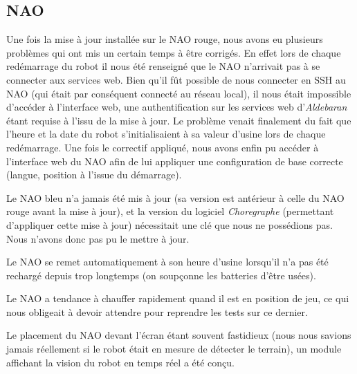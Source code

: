 \subsection{NAO}
  \par Une fois la mise à jour installée sur le NAO rouge, nous avons eu plusieurs problèmes qui ont mis un certain temps à être corrigés.
  En effet lors de chaque redémarrage du robot il nous été renseigné que le NAO n’arrivait pas à se connecter aux services web.
  Bien qu’il fût possible de nous connecter en SSH au NAO (qui était par conséquent connecté au réseau local), il nous était impossible d’accéder à l’interface web, une authentification sur les services web d’\textit{Aldebaran} étant requise à l'issu de la mise à jour.
  Le problème venait finalement du fait que l’heure et la date du robot s’initialisaient à sa valeur d’usine lors de chaque redémarrage.
  Une fois le correctif appliqué, nous avons enfin pu accéder à l'interface web du NAO afin de lui appliquer une configuration de base correcte (langue, position à l'issue du démarrage).
  \par Le NAO bleu n’a jamais été mis à jour (sa version est antérieur à celle du NAO rouge avant la mise à jour), et la version du logiciel \textit{Choregraphe} (permettant d’appliquer cette mise à jour) nécessitait une clé que nous ne possédions pas.
  Nous n'avons donc pas pu le mettre à jour.
  \par Le NAO se remet automatiquement à son heure d’usine lorsqu’il n’a pas été rechargé depuis trop longtemps (on soupçonne les batteries d’être usées).
  \par Le NAO a tendance à chauffer rapidement quand il est en position de jeu, ce qui nous obligeait à devoir attendre pour reprendre les tests sur ce dernier.
  \par Le placement du NAO devant l’écran étant souvent fastidieux (nous nous savions jamais réellement si le robot était en mesure de détecter le terrain), un module affichant la vision du robot en temps réel a été conçu.

